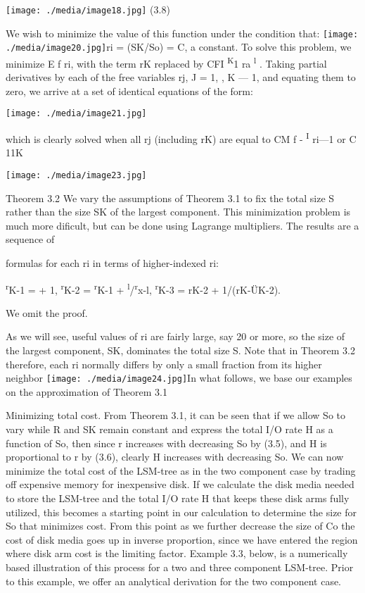 \documentclass[a4paper,12pt,notitlepage,twoside,openright]{article}
\begin{document}
\texttt{[image: ./media/image18.jpg]}
(3.8)


We wish to minimize the value of this function under the condition that:
\texttt{[image: ./media/image20.jpg]}ri
= (SK/So) = C, a constant. To solve this problem, we minimize E f ri,
with the term rK replaced by CFI \textsuperscript{K}1 ra
\textsuperscript{l} . Taking partial derivatives by each of the free
variables rj, J = 1, , K --- 1, and equating them to zero, we arrive at
a set of identical equations of the form:

\texttt{[image: ./media/image21.jpg]}

which is clearly solved when all rj (including rK) are equal to CM f -
\textsuperscript{I} ri---1 or C 11K

\texttt{[image: ./media/image23.jpg]}

Theorem 3.2 We vary the assumptions of Theorem 3.1 to fix the total size
S rather than the size SK of the largest component. This minimization
problem is much more dificult, but can be done using Lagrange
multipliers. The results are a sequence of

formulas for each ri in terms of higher-indexed ri:

\textsuperscript{r}K-1 = + 1, \textsuperscript{r}K-2 =
\textsuperscript{r}K-1 + \textsuperscript{l}/\textsuperscript{r}x-l,
\textsuperscript{r}K-3 = rK-2 + 1/(rK-ÜK-2).

We omit the proof.

As we will see, useful values of ri are fairly large, say 20 or more, so
the size of the largest component, SK, dominates the total size S. Note
that in Theorem 3.2 therefore, each ri normally differs by only a small
fraction from its higher neighbor
\texttt{[image: ./media/image24.jpg]}In
what follows, we base our examples on the approximation of Theorem 3.1

Minimizing total cost. From Theorem 3.1, it can be seen that if we allow
So to vary while R and SK remain constant and express the total I/O rate
H as a function of So, then since r increases with decreasing So by
(3.5), and H is proportional to r by (3.6), clearly H increases with
decreasing So. We can now minimize the total cost of the LSM-tree as in
the two component case by trading off expensive memory for inexpensive
disk. If we calculate the disk media needed to store the LSM-tree and
the total I/O rate H that keeps these disk arms fully utilized, this
becomes a starting point in our calculation to determine the size for So
that minimizes cost. From this point as we further decrease the size of
Co the cost of disk media goes up in inverse proportion, since we have
entered the region where disk arm cost is the limiting factor. Example
3.3, below, is a numerically based illustration of this process for a
two and three component LSM-tree. Prior to this example, we offer an
analytical derivation for the two component case.
\end{document}
